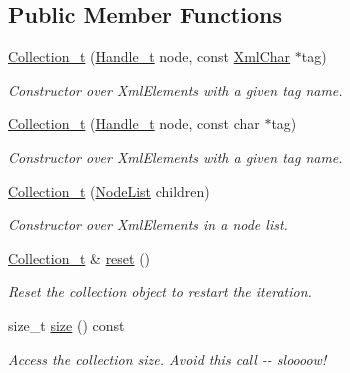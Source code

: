 \subsection*{Public Member Functions}
\begin{DoxyCompactItemize}
\item 
\hyperlink{class_d_d4hep_1_1_x_m_l_1_1_collection__t_a46561de1f154c3b06435766504b9d3db}{Collection\_\-t} (\hyperlink{class_d_d4hep_1_1_x_m_l_1_1_handle__t}{Handle\_\-t} node, const \hyperlink{namespace_d_d4hep_1_1_x_m_l_a09e5d9cc86ed782f6826dfe0778c1815}{XmlChar} $\ast$tag)
\begin{DoxyCompactList}\small\item\em Constructor over XmlElements with a given tag name. \item\end{DoxyCompactList}\item 
\hyperlink{class_d_d4hep_1_1_x_m_l_1_1_collection__t_a65effa5c14bd2aef11552cc9737022f9}{Collection\_\-t} (\hyperlink{class_d_d4hep_1_1_x_m_l_1_1_handle__t}{Handle\_\-t} node, const char $\ast$tag)
\begin{DoxyCompactList}\small\item\em Constructor over XmlElements with a given tag name. \item\end{DoxyCompactList}\item 
\hyperlink{class_d_d4hep_1_1_x_m_l_1_1_collection__t_a0db8adadf0bba07706766dbc027f5151}{Collection\_\-t} (\hyperlink{class_d_d4hep_1_1_x_m_l_1_1_node_list}{NodeList} children)
\begin{DoxyCompactList}\small\item\em Constructor over XmlElements in a node list. \item\end{DoxyCompactList}\item 
\hyperlink{class_d_d4hep_1_1_x_m_l_1_1_collection__t}{Collection\_\-t} \& \hyperlink{class_d_d4hep_1_1_x_m_l_1_1_collection__t_adeb2667661d9b30037d28e6045068b00}{reset} ()
\begin{DoxyCompactList}\small\item\em Reset the collection object to restart the iteration. \item\end{DoxyCompactList}\item 
size\_\-t \hyperlink{class_d_d4hep_1_1_x_m_l_1_1_collection__t_a8e5128ccacf7530ee556b2164ce9fe56}{size} () const 
\begin{DoxyCompactList}\small\item\em Access the collection size. Avoid this call -\/-\/ sloooow! \item\end{DoxyCompactList}\item 

\end{DoxyCompactItemize}
